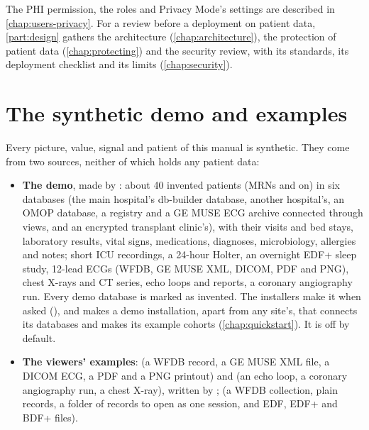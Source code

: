 \begin{phibox}
The PHI permission, the roles and Privacy Mode's settings are described in
\cref{chap:users-privacy}. For a review before a deployment on patient data, \cref{part:design}
gathers the architecture (\cref{chap:architecture}), the protection of patient data
(\cref{chap:protecting}) and the security review, with its standards, its deployment checklist
and its limits (\cref{chap:security}).
\end{phibox}

\section{The synthetic demo and examples}
\label{sec:introduction-demo}

Every picture, value, signal and patient of this manual is synthetic. They come from two
sources, neither of which holds any patient data:

\begin{itemize}
\item \textbf{The demo}, made by : about 40 invented patients
  (MRNs  and on) in six databases (the main hospital's db-builder database, another
  hospital's, an OMOP database, a registry and a GE MUSE ECG archive connected through views,
  and an encrypted transplant clinic's), with their visits and bed stays, laboratory results,
  vital signs, medications, diagnoses, microbiology, allergies and notes; short ICU recordings,
  a 24-hour Holter, an overnight EDF+ sleep study, 12-lead ECGs (WFDB, GE MUSE XML, DICOM, PDF
  and PNG), chest X-rays and CT series, echo loops and reports, a coronary angiography run.
  Every demo database is marked as invented. The installers make it when asked (),
  and  makes a demo installation, apart from any site's, that
  connects its databases and makes its example cohorts (\cref{chap:quickstart}). It is off by
  default.
\item \textbf{The viewers' examples}:  (a WFDB record, a GE MUSE
  XML file, a DICOM ECG, a PDF and a PNG printout) and  (an echo
  loop, a coronary angiography run, a chest X-ray), written by
  ;  (a WFDB
  collection, plain records, a folder of records to open as one session, and EDF, EDF+ and BDF+
  files).
\end{itemize}

